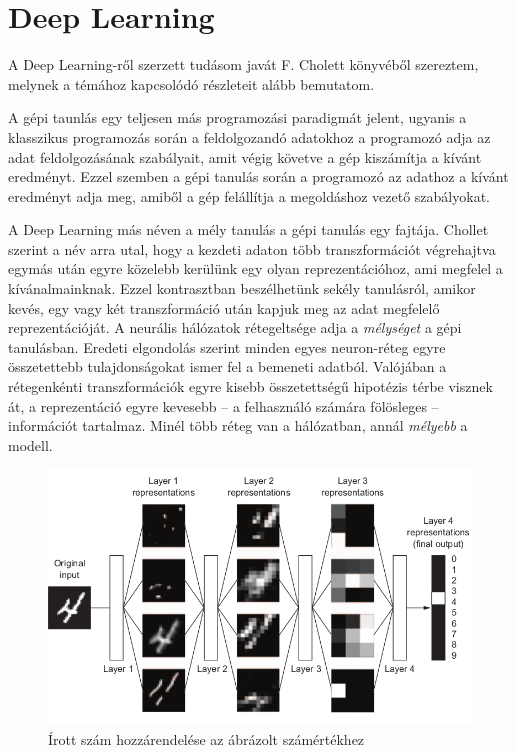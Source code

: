 \section{Deep Learning}
A Deep Learning-ről szerzett tudásom javát F. Cholett könyvéből\cite{Chollet} szereztem, melynek a témához kapcsolódó részleteit alább bemutatom.

A gépi taunlás egy teljesen más programozási paradigmát jelent, ugyanis a klasszikus programozás során a feldolgozandó adatokhoz a programozó adja az adat feldolgozásának szabályait, amit végig követve a gép kiszámítja a kívánt eredményt. Ezzel szemben a gépi tanulás során a programozó az adathoz  a kívánt eredményt adja meg, amiből a gép felállítja a megoldáshoz vezető szabályokat.%

A Deep Learning más néven a mély tanulás a gépi tanulás egy fajtája. Chollet szerint a név arra utal, hogy a kezdeti adaton több transzformációt végrehajtva egymás után egyre közelebb kerülünk egy olyan reprezentációhoz, ami megfelel a kívánalmainknak. Ezzel kontrasztban beszélhetünk sekély tanulásról, amikor kevés, egy vagy két transzformáció után kapjuk meg az adat megfelelő reprezentációját.%
A neurális hálózatok rétegeltsége adja a \emph{mélységet} a gépi tanulásban. Eredeti elgondolás szerint minden egyes neuron-réteg egyre összetettebb tulajdonságokat ismer fel a bemeneti adatból. Valójában a rétegenkénti transzformációk egyre kisebb összetettségű hipotézis térbe visznek át, a reprezentáció egyre kevesebb -- a felhasználó számára fölösleges -- információt tartalmaz. Minél több réteg van a hálózatban, annál \emph{mélyebb} a modell.

\begin{figure}[h]
	\centering
	\includegraphics[width=0.8\columnwidth]{fig/digit_classification.png}
	\caption{Írott szám hozzárendelése az ábrázolt számértékhez}
	\label{fig:digit_classification}
	\footnotemark
\end{figure}

